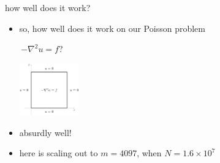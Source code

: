 \documentclass[10pt,
               svgnames,
               hyperref={colorlinks,citecolor=DeepPink4,linkcolor=FireBrick,urlcolor=Maroon},
               usepdftitle=false]{beamer}
\newcommand{\grad}{\nabla}
\begin{document}
\begin{frame}{how well does it work?}
\begin{itemize}
\item so, how well does it work on our Poisson problem

\,$-\grad^2 u=f$?

\vspace{-5mm}
\hfill \includegraphics[width=0.2\textwidth]{images/poisson.png}

\vspace{-13mm}
\item absurdly well!
\item here is scaling out to $m=4097$, when $N=1.6\times 10^7$
\end{itemize}


\end{frame}
\end{document}

